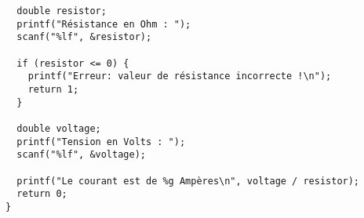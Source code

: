 \documentclass[french,a4paper,addpoints,11pt]{exam}
\begin{document}
\begin{questions}
\begin{solution}
\begin{lstlisting}
  double resistor;
  printf("Résistance en Ohm : ");
  scanf("%lf", &resistor);

  if (resistor <= 0) {
    printf("Erreur: valeur de résistance incorrecte !\n");
    return 1;
  }

  double voltage;
  printf("Tension en Volts : ");
  scanf("%lf", &voltage);

  printf("Le courant est de %g Ampères\n", voltage / resistor);
  return 0;
}
\end{lstlisting}
\end{solution}
\else
\makeemptybox{10cm}
\fi

\end{questions}
\end{document}
